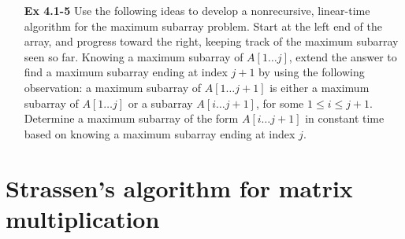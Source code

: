 \documentclass[fontsize=12pt,paper=a4]{book}
\begin{document}
\begin{enumerate}
	\item[\textbf{Ex 4.1-5}]
		Use the following ideas to develop a nonrecursive, linear-time algorithm for the maximum subarray problem. Start at the left end of the array, and progress toward the right, keeping track of the maximum subarray seen so far. Knowing a maximum subarray of $A[1 \dots j]$, extend the answer to find a maximum subarray ending at index $j+1$ by using the following observation: a maximum subarray of $A[1 \dots j+1]$ is either a maximum subarray of $A[1 \dots j]$ or a subarray $A[i \dots j+1]$, for some $1 \leq i \leq j+1$. Determine a maximum subarray of the form $A[i \dots j+1]$ in constant time based on knowing a maximum subarray ending at index $j$.		
\end{enumerate}

\section{Strassen’s algorithm for matrix multiplication}
\end{document}
